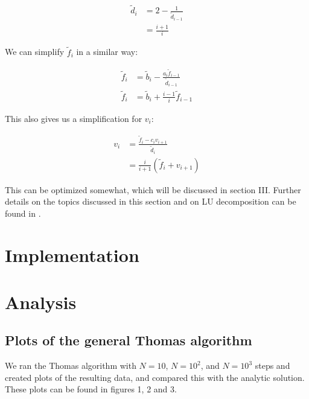 \documentclass[english,notitlepage,reprint]{revtex4-1}  %
\begin{document}
\begin{align*}
\tilde{d}_i &= 2 - \frac{1}{\tilde{d}_{i-1}} \\
&= \frac{i+1}{i}
\end{align*}

We can simplify $\tilde{f}_i$ in a similar way:

\begin{align*}
\tilde{f}_i &= \tilde{b}_i - \frac{a_i \tilde{f}_{i-1}}{\tilde{d}_{i-1}} \\
\tilde{f}_i &= \tilde{b}_i + \frac{i-1}{i}\tilde{f}_{i-1}
\end{align*}

This also gives us a simplification for $v_i$:

\begin{align*}
v_i &= \frac{\tilde{f}_i - c_i v_{i+1}}{\tilde{d}_i} \\
&= \frac{i}{i+1}(\tilde{f}_i + v_{i+1})
\end{align*}

This can be optimized somewhat, which will be discussed in section III. Further details on the topics discussed in this section and on LU decomposition can be found in \citep{Hjorth-Jensen2015}.

\newpage


\section{Implementation} \label{sec:III}

\section{Analysis} \label{sec:IV}
\subsection{Plots of the general Thomas algorithm} \label{subsec:IV:A}

We ran the Thomas algorithm with $N=10$, $N=10^2$, and $N=10^3$ steps and created plots of the resulting data, and compared this with the analytic solution. These plots can be found in figures 1, 2 and 3.   
\end{document}
